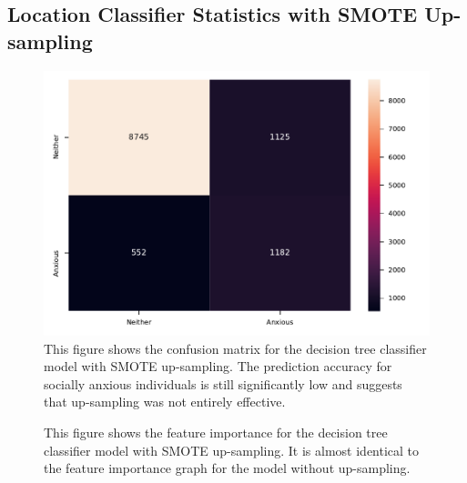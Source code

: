 \documentclass{l4proj}
\begin{document}
\begin{appendices}
\chapter{Location Classifier Statistics with SMOTE Up-sampling}
\begin{figure}[htb]
    \centering
    \includegraphics[width=\linewidth]{images/location/heatmap_Decision_Tree_Locations_sm.pdf}
    \caption{This figure shows the confusion matrix for the decision tree classifier model with SMOTE up-sampling. The prediction accuracy for socially anxious individuals is still significantly low and suggests that up-sampling was not entirely effective.}
    \label{fig:location_sm_matrix} 
\end{figure}

\begin{figure}[htb]
    \centering
    \noindent{}
    \caption{This figure shows the feature importance for the decision tree classifier model with SMOTE up-sampling. It is almost identical to the feature importance graph for the model without up-sampling.}
    \label{fig:location_sm_feature_importance} 
\end{figure}


\end{appendices}
\end{document}
